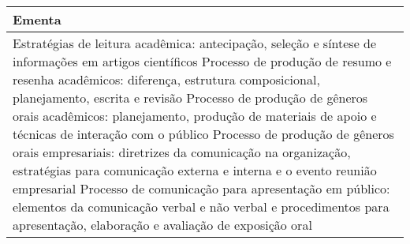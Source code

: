 \begin{quadro}[ht!]
\begin{tabular}{|p{3cm} p{2cm} p{3cm} p{2cm} p{3cm} p{2cm}|}
\multicolumn{6}{|p{15cm}|}{\cellcolor{blue1} Ementa} \\\hline
\hline\multicolumn{6}{|p{15cm}|}{\scriptsize Estratégias de leitura acadêmica: antecipação, seleção e síntese de informações em artigos científicos Processo de produção de resumo e resenha acadêmicos: diferença, estrutura composicional, planejamento, escrita e revisão Processo de produção de gêneros orais acadêmicos: planejamento, produção de materiais de apoio e técnicas de interação com o público Processo de produção de gêneros orais empresariais: diretrizes da comunicação na organização, estratégias para comunicação externa e interna e o evento reunião empresarial Processo de comunicação para apresentação em público: elementos da comunicação verbal e não verbal e procedimentos para apresentação, elaboração e avaliação de exposição oral}\\\hline
\hline
	\end{tabular}
\end{quadro}
